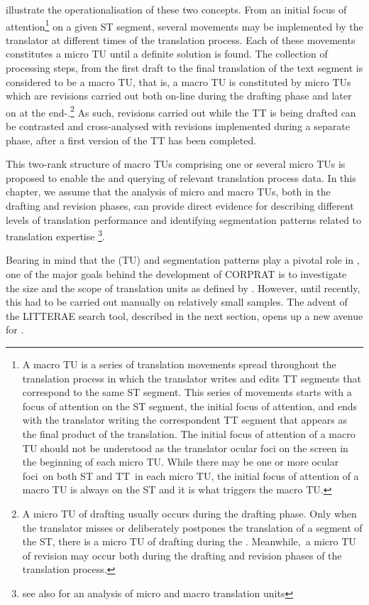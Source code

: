 \documentclass[output=paper]{LSP/langsci}
\begin{document}
\largerpage
\citet{AlvesVale2009} illustrate the operationalisation of these two concepts. From an initial focus of attention\footnote{A macro TU is a series of translation movements spread throughout the translation process in which the translator writes and edits TT segments that correspond to the same ST segment. This series of movements starts with a focus of attention on the ST segment, the initial focus of attention, and ends with the translator writing the correspondent TT segment that appears as the final product of the translation. The initial focus of attention of a macro TU should not be understood as the translator ocular foci on the screen in the beginning of each micro TU. While there may be one or more ocular foci~on both ST and TT~in each micro TU, the initial focus of attention of a macro TU is always on the ST and it is what triggers the macro TU.} on a given ST segment, several movements may be implemented by the translator at different times of the translation process. Each of these movements constitutes a micro TU until a definite solution is found. The collection of processing steps, from the first draft to the final translation of the text segment is considered to be a macro TU, that is, a macro TU is constituted by micro TUs which are revisions carried out both on-line during the drafting phase and later on at the end-.\footnote{A micro TU of drafting usually occurs during the drafting phase. Only when the translator misses or deliberately postpones the translation of a segment of the ST, there is a micro TU of drafting during the . Meanwhile,~a micro TU of revision may occur both during the drafting and revision phases of the translation process.} As such, revisions carried out while the TT is being drafted can be contrasted and cross-analysed with revisions implemented during a separate phase, after a first version of the TT has been completed.

This two-rank structure of macro TUs comprising one or several micro TUs is proposed to enable the  and querying of relevant translation process data. In this chapter, we assume that the analysis of micro and macro TUs, both in the drafting and revision phases, can provide direct evidence for describing different levels of translation performance and identifying segmentation patterns related to translation expertise \footnote{see also \cite{AlvesEtAl2010} for an analysis of micro and macro translation units}.

Bearing in mind that the  (TU) and segmentation patterns play a pivotal role in , one of the major goals behind the development of CORPRAT is to investigate the size and the scope of translation units as defined by \citet{Alves2000}. However, until recently, this had to be carried out manually on relatively small samples. The advent of the LITTERAE search tool, described in the next section, opens up a new avenue for .
\end{document}
